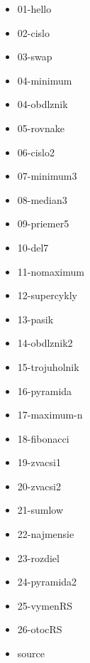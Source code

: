 



\begin{itemize}
\item 01-hello
\item 02-cislo
\item 03-swap
\item 04-minimum
\item 04-obdlznik
\item 05-rovnake
\item 06-cislo2
\item 07-minimum3
\item 08-median3
\item 09-priemer5
\item 10-del7
\item 11-nomaximum
\item 12-supercykly
\item 13-pasik
\item 14-obdlznik2
\item 15-trojuholnik
\item 16-pyramida
\item 17-maximum-n
\item 18-fibonacci
\item 19-zvacsi1
\item 20-zvacsi2
\item 21-sumlow
\item 22-najmensie
\item 23-rozdiel
\item 24-pyramida2
\item 25-vymenRS
\item 26-otocRS
\item source
\end{itemize}

